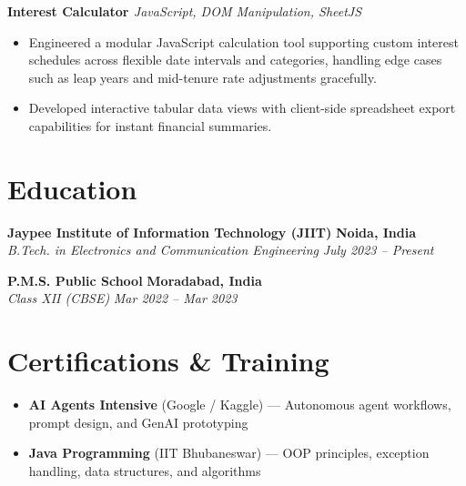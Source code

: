 \documentclass[11pt, a4paper]{article}
\newcommand{\resumeItem}[1]{\item{\small #1}}
\newcommand{\resumeSubheading}[4]{
    \vspace{1pt}
    \noindent\textbf{\normalsize #1} \hfill \textbf{\small #2}\\
    \textit{\small #3} \hfill \textit{\small #4}\par
    \vspace{1pt}
}
\newcommand{\resumeProjectHeading}[2]{
    \vspace{2pt}
    \noindent\textbf{\small #1} \hfill \textit{\small #2}\par
    \vspace{1pt}
}
\begin{document}
\resumeProjectHeading{Interest Calculator \href{https://github.com/Maaahive/GirviBook}{\faIcon{github}}}{JavaScript, DOM Manipulation, SheetJS}
\begin{itemize}
    \resumeItem{Engineered a modular JavaScript calculation tool supporting custom interest schedules across flexible date intervals and categories, handling edge cases such as leap years and mid-tenure rate adjustments gracefully.}
    \resumeItem{Developed interactive tabular data views with client-side spreadsheet export capabilities for instant financial summaries.}
\end{itemize}

\section*{Education}
\vspace{-2pt}
\resumeSubheading{Jaypee Institute of Information Technology (JIIT)}{Noida, India}{B.Tech. in Electronics and Communication Engineering}{July 2023 -- Present}

\resumeSubheading{P.M.S. Public School}{Moradabad, India}{Class XII (CBSE)}{Mar 2022 -- Mar 2023}

\section*{Certifications \& Training}
\vspace{-2pt}
\begin{itemize}[leftmargin=*, itemsep=2pt]
    \small
    \item \textbf{AI Agents Intensive} (Google / Kaggle) --- Autonomous agent workflows, prompt design, and GenAI prototyping
    \item \textbf{Java Programming} (IIT Bhubaneswar) --- OOP principles, exception handling, data structures, and algorithms
\end{itemize}
\end{document}
